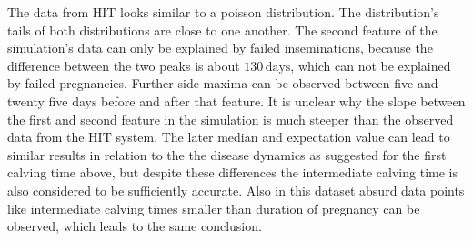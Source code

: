 The data from HIT looks similar to a poisson distribution. The distribution's tails of both distributions are close to one another. The second feature of the simulation's data can only be explained by failed inseminations, because the difference between the two peaks is about $130\,\text{days}$, which can not be explained by failed pregnancies. Further side maxima can be observed between five and twenty five days before and after that feature. It is unclear why the slope between the first and second feature in the simulation is much steeper than the observed data from the HIT system. The later median and expectation value can lead to similar results in relation to the the disease dynamics as suggested for the first calving time above, but despite these differences the intermediate calving time is also considered to be sufficiently accurate. Also in this dataset absurd data points like intermediate calving times smaller than duration of pregnancy can be observed, which leads to the same conclusion. 

